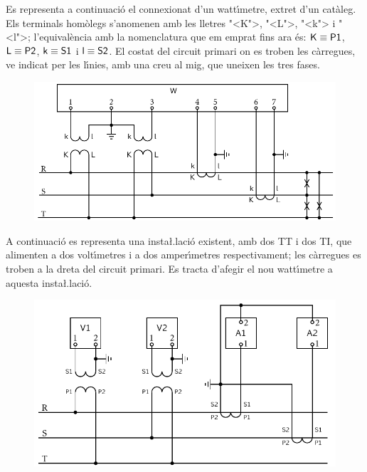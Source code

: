 \begin{exemple}

Es representa a continuaci\'{o} el connexionat d'un watt\'{\i}metre, extret
d'un cat\`{a}leg. Els terminals hom\`{o}legs s'anomenen amb les lletres {"<}\textsf{K}{">},
{"<}\textsf{L}{">}, {"<}\textsf{k}{">} i {"<}\textsf{l}{">}; l'equival\`{e}ncia amb la nomenclatura que em emprat
fins ara \'{e}s: $\text{\textsf{K}}\equiv\text{\textsf{P1}}$, $\text{\textsf{L}}\equiv\text{\textsf{P2}}$,
$\text{\textsf{k}}\equiv\text{\textsf{S1}}$ i $\text{\textsf{l}}\equiv\text{\textsf{S2}}$. El
costat del circuit primari on es troben les c\`{a}rregues, ve indicat
per les l\'{\i}nies, amb una creu al mig, que uneixen les tres fases.

\begin{figure}[h]
\centering
    \includegraphics{Imatges/Cap-TrafosMesProt-Watt.pdf}
\end{figure}

A continuaci\'{o} es representa una insta{\l.l}aci\'{o} existent, amb dos TT i
dos TI, que alimenten a dos volt\'{\i}metres i a dos amper\'{\i}metres
respectivament; les c\`{a}rregues es troben a la dreta del circuit
primari. Es tracta d'afegir el nou watt\'{\i}metre a aquesta
insta{\l.l}aci\'{o}.

\begin{figure}[h]
\centering
    \includegraphics{Imatges/Cap-TrafosMesProt-Instal.pdf}
\end{figure}


\end{exemple}

